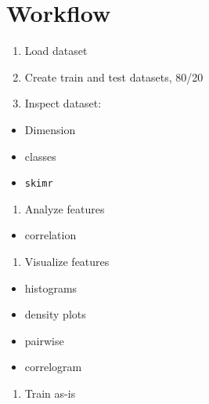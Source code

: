 \documentclass[]{book}
\providecommand{\tightlist}{%
  \setlength{\itemsep}{0pt}\setlength{\parskip}{0pt}}
\begin{document}
\hypertarget{workflow-2}{%
\section{Workflow}\label{workflow-2}}

\begin{enumerate}
\def\labelenumi{\arabic{enumi}.}
\tightlist
\item
  Load dataset
\item
  Create train and test datasets, 80/20
\item
  Inspect dataset:
\end{enumerate}

\begin{itemize}
\tightlist
\item
  Dimension
\item
  classes
\item
  \texttt{skimr}
\end{itemize}

\begin{enumerate}
\def\labelenumi{\arabic{enumi}.}
\setcounter{enumi}{3}
\tightlist
\item
  Analyze features
\end{enumerate}

\begin{itemize}
\tightlist
\item
  correlation
\end{itemize}

\begin{enumerate}
\def\labelenumi{\arabic{enumi}.}
\setcounter{enumi}{4}
\tightlist
\item
  Visualize features
\end{enumerate}

\begin{itemize}
\tightlist
\item
  histograms
\item
  density plots
\item
  pairwise
\item
  correlogram
\end{itemize}

\begin{enumerate}
\def\labelenumi{\arabic{enumi}.}
\setcounter{enumi}{4}
\tightlist
\item
  Train as-is\\
\end{enumerate}
\end{document}
